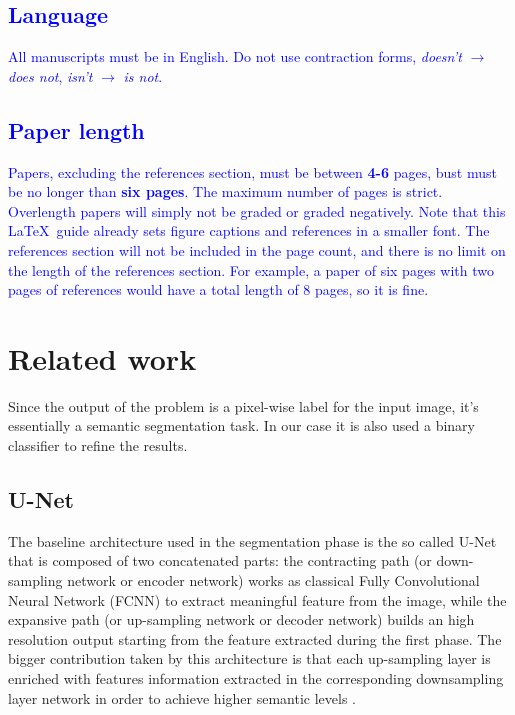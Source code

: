 \documentclass[10pt,twocolumn,letterpaper]{article}
\begin{document}
   \textcolor{blue}{
   \subsection{Language}
      All manuscripts must be in English. Do not use contraction forms, \eg \emph{doesn't} $\xrightarrow{}$ \emph{does not}, \emph{isn't} $\xrightarrow{}$ \emph{is not}. }

   \textcolor{blue}{
   \subsection{Paper length}
      Papers, excluding the references section, must be between \textbf{4-6} pages, bust must be no longer than \textbf{six pages}. The maximum number of pages is strict. Overlength papers will simply not be graded or graded negatively. Note that this \LaTeX\ guide already sets figure captions and references in a smaller font.
      The references section will not be included in the page count, and there is no limit on the length of the references section. For example, a paper of six pages with two pages of references would have a total length of 8 pages, so it is fine.}



\section{Related work}
   Since the output of the problem is a pixel-wise label for the input image, it’s essentially a semantic segmentation task. In our case it is also used a binary classifier to refine the results.
   \subsection{U-Net}
      The baseline architecture used in the segmentation phase is the so called U-Net that is composed of two concatenated parts: the contracting path (or down-sampling network or encoder network) works as classical Fully Convolutional Neural Network (FCNN) to extract meaningful feature from the image, while the expansive path (or up-sampling network or decoder network) builds an high resolution output starting from the feature extracted during the first phase. The bigger contribution taken by this architecture is that each up-sampling layer is enriched with features information extracted in the corresponding downsampling layer network in order to achieve higher semantic levels \cite{Unet}. 
\end{document}
